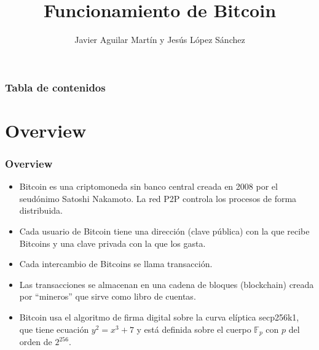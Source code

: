 \documentclass{beamer}
\title{Funcionamiento de Bitcoin}
\author{Javier Aguilar Martín y Jesús López Sánchez}
\institute{Universidad de Sevilla}
\date{}
\theoremstyle{definition}
\begin{document}
\frame{\titlepage}
%
%
% 
% 
% 

% 



\newcommand{\seti}{\setcounter{saveenumi}{\value{enumi}}}
\newcommand{\conti}{\setcounter{enumi}{\value{saveenumi}}}

\begin{frame}
\frametitle{Tabla de contenidos}
\tableofcontents
\end{frame}

%	
%

\section{Overview}
\begin{frame}
	\frametitle{Overview}
	\begin{itemize}
		\item<1-> Bitcoin es una criptomoneda sin banco central creada en 2008 por el seudónimo Satoshi Nakamoto. La red P2P controla los procesos de forma distribuida.
		\item<2-> Cada usuario de Bitcoin tiene una dirección (clave pública) con la que recibe Bitcoins y una clave privada con la que los gasta.
		\item<3-> Cada intercambio de Bitcoins se llama transacción.
		\item<4-> Las transacciones se almacenan en una cadena de bloques (blockchain) creada por ``mineros'' que sirve como libro de cuentas.
		\item<5-> Bitcoin usa el algoritmo de firma digital sobre la curva elíptica secp256k1, que tiene ecuación $y^2 = x^3 + 7$ y está definida sobre el cuerpo $\mathbb{F}_p$ con $p$ del orden de $2^{256}$.
	\end{itemize}
	
	
	
	
	
	
	
\end{frame}
\end{document}
